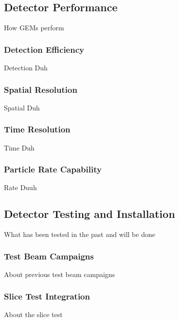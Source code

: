         \subsection{Detector Performance}

            How GEMs perform

            \subsubsection{Detection Efficiency}

                Detection Duh

            \subsubsection{Spatial Resolution}

                Spatial Duh

            \subsubsection{Time Resolution}

                Time Duh

            \subsubsection{Particle Rate Capability}

                Rate Duuh

        \subsection{Detector Testing and Installation}

            What has been tested in the past and will be done

            \subsubsection{Test Beam Campaigns}

                About previous test beam campaigns

            \subsubsection{Slice Test Integration}

                About the slice test


